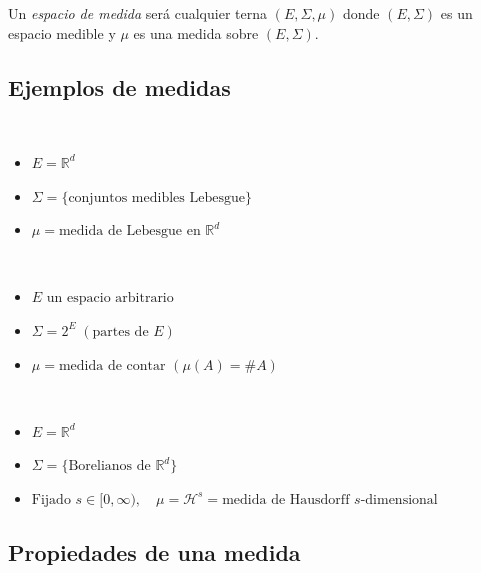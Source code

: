 \begin{definition}
    Un \textit{espacio de medida} será cualquier terna \((E, \Sigma, \mu)\) donde \((E, \Sigma)\) es un espacio medible y \(\mu\) es una medida sobre \((E, \Sigma)\).
\end{definition}

\subsection{Ejemplos de medidas}

\begin{eg}~
    \begin{itemize}
        \item $E = \mathbb{R}^d$

        \item $\Sigma = \{\text{conjuntos medibles Lebesgue}\}$

        \item $\mu = \text{medida de Lebesgue en } \mathbb{R}^d$
    \end{itemize}
\end{eg}

\begin{eg}~
    \begin{itemize}
        \item $E \text{ un espacio arbitrario}$

        \item $\Sigma = 2^{E} \; (\text{partes de } E)$

		\item $\mu = \text{medida de contar } (\mu(A) = \#A)$
    \end{itemize}
\end{eg}

\begin{eg}~
    \begin{itemize}
        \item $E = \mathbb{R}^d$

        \item $\Sigma = \{\text{Borelianos de } \mathbb{R}^d\}$

        \item $\text{Fijado } s \in [0,\infty), \quad \mu = \mathcal{H}^s = \text{medida de Hausdorff } s\text{-dimensional}$
    \end{itemize}
\end{eg}

\subsection{Propiedades de una medida}

